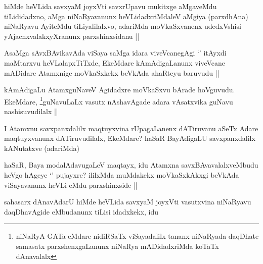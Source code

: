 \begin{artha}
hiMde heVLida savxyaM joyxVti savxrUpavu mukitxge aMgaveMdu tiLididadxno, aMga niNaRyavanunx heVLidadxriMdaleV aMgiya (parxdhAna) niNaRyavu AyiteMdu tiLiyalilalxvo, adariMda moVkaSxvanenx udedxVshisi yAjacnxvalakxyXranunx parxshinxsidanu ||
\end{artha}


\begin{artha}
AsaMga sAvxBAvikavAda viSaya saMga idara viveVcanegAgi `\stext' itAyxdi maMtarxvu heVLalapxTiTxde, EkeMdare kAmAdigaLanunx viveVcane mADidare Atamxnige moVkaSxkekx beVkAda ahaRteyu baruvudu ||
\end{artha}

\begin{artha}
kAmAdigaLu AtamxguNaveV Agidadxre moVkaSxvu bArade hoVguvudu. EkeMdare, \footnote{niNaRyA GATa-eMdare nidiRSaTx viSayadalilx tananx niNaRyada daqDhate samasatx parxshenxgaLanunx niNaRya mADidadxriMda koTaTx dAnavalalx}guNavuLaLx vasutx nAshavAgade adara vAsatxvika guNavu nashisuvudilalx ||
\end{artha}


\begin{artha}
I Atamxnu savxpanxdalilx maqtuyxvina rUpagaLanenx dATiruvanu aSeTx Adare maqtuyxvanunx dATiruvudilalx, EkeMdare? haSaR BayAdigaLU savxpanxdalilx kANutatxve (adariMda)
\end{artha}


\begin{artha}
haSaR, Baya modalAdavugaLeV maqtayx, idu Atamxna savxBAvavalalxveMbudu heVgo hAgeye `\stext' pujayxre? ililxMda muMdakekx moVkaSxkAkxgi beVkAda viSayavanunx heVLi eMdu parxshinxside ||
\end{artha}


\begin{artha}
sahasarx dAnavAdarU hiMde heVLida savxyaM joyxVti vasutxvina niNaRyavu daqDhavAgide eMbudanunx tiLisi idadxkekx, idu
\end{artha}


